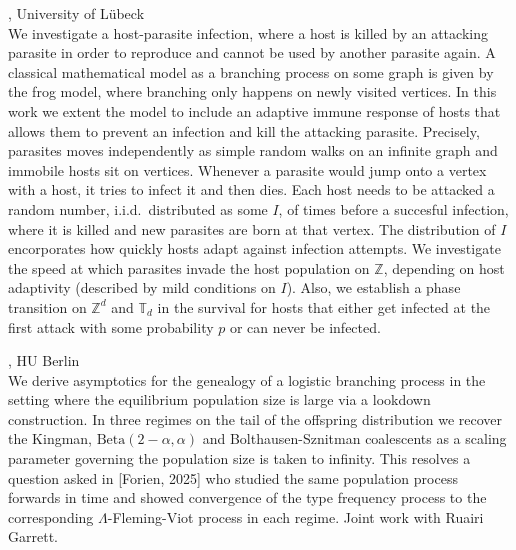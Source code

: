 \documentclass[12pt,a4paper]{article}
\begin{document}
\bigskip\bigskip

, University of Lübeck \\[2ex] We investigate a host-parasite infection, where a host is killed by an attacking parasite in order to reproduce and cannot be used by another parasite again. A classical mathematical model as a branching process on some graph is given by the frog model, where branching only happens on newly visited vertices. In this work we extent the model to include an adaptive immune response of hosts that allows them to prevent an infection and kill the attacking parasite. Precisely, parasites moves independently as simple random walks on an infinite graph and immobile hosts sit on vertices. Whenever a parasite would jump onto a vertex with a host, it tries to infect it and then dies. Each host needs to be attacked a random number, i.i.d.~distributed as some $I$, of times before a succesful infection, where it is killed and new parasites are born at that vertex. The distribution of $I$ encorporates how quickly hosts adapt against infection attempts.  We investigate the speed at which parasites invade the host population on $\mathbb{Z}$, depending on host adaptivity (described by mild conditions on $I$). Also, we establish a phase transition on $\mathbb{Z}^d$ and $\mathbb{T}_d$ in the survival for hosts that either get infected at the first attack with some probability $p$ or can never be infected. 

\bigskip\bigskip

, HU Berlin \\[2ex] We derive asymptotics for the genealogy of a logistic branching process in the setting where the equilibrium population size is large via a lookdown construction. In three regimes on the tail of the offspring distribution we recover the Kingman, \(\text{Beta}(2-\alpha, \alpha)\) and Bolthausen-Sznitman coalescents as a scaling parameter governing the population size is taken to infinity. This resolves a question asked in [Forien, 2025] who studied the same population process forwards in time and showed convergence of the type frequency process to the corresponding \(\Lambda\)-Fleming-Viot process in each regime. Joint work with Ruairi Garrett. 
\end{document}
